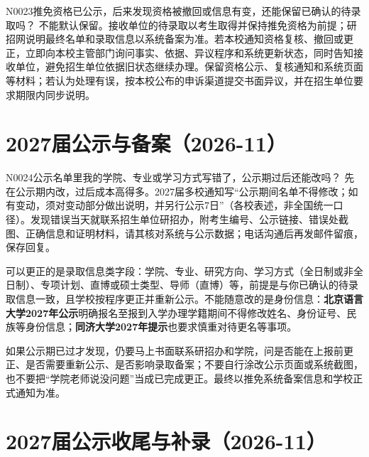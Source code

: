 \begin{qa}{N0023}{推免资格已公示，后来发现资格被撤回或信息有变，还能保留已确认的待录取吗？}
不能默认保留。接收单位的待录取以考生取得并保持推免资格为前提；研招网说明最终名单和录取信息以系统备案为准。若本校通知资格复核、撤回或更正，立即向本校主管部门询问事实、依据、异议程序和系统更新状态，同时告知接收单位，避免招生单位依据旧状态继续办理。保留资格公示、复核通知和系统页面等材料；若认为处理有误，按本校公布的申诉渠道提交书面异议，并在招生单位要求期限内同步说明。
\end{qa}

\section{2027届公示与备案（2026-11）}

\begin{qa}{N0024}{公示名单里我的学院、专业或学习方式写错了，公示期过后还能改吗？}
先在公示期内改，过后成本高得多。2027届多校通知写“公示期间名单不得修改；如有变动，须对变动部分做出说明，并另行公示7日”（各校表述，非全国统一口径）。发现错误当天就联系招生单位研招办，附考生编号、公示链接、错误处截图、正确信息和证明材料，请其核对系统与公示数据；电话沟通后再发邮件留痕，保存回复。

可以更正的是录取信息类字段：学院、专业、研究方向、学习方式（全日制或非全日制）、专项计划、直博或硕士类型、导师（直博）等，前提是与你已确认的待录取信息一致，且学校按程序更正并重新公示。不能随意改的是身份信息：\textbf{北京语言大学2027年公示}明确报名至报到入学办理学籍期间不得修改姓名、身份证号、民族等身份信息；\textbf{同济大学2027年提示}也要求慎重对待更名等事项。

如果公示期已过才发现，仍要马上书面联系研招办和学院，问是否能在上报前更正、是否需要重新公示、是否影响录取备案；不要自行涂改公示页面或系统截图，也不要把“学院老师说没问题”当成已完成更正。最终以推免系统备案信息和学校正式通知为准。
\end{qa}
\section{2027届公示收尾与补录（2026-11）}

